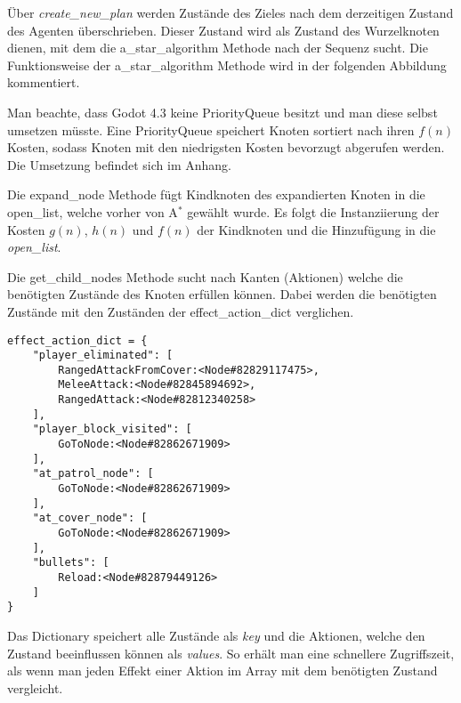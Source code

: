 Über \textit{create\_new\_plan} werden Zustände des Zieles nach dem derzeitigen Zustand des Agenten überschrieben. Dieser Zustand wird als Zustand des Wurzelknoten dienen, mit dem die a\_star\_algorithm Methode nach der Sequenz sucht. Die Funktionsweise der a\_star\_algorithm Methode wird in der folgenden Abbildung kommentiert.



Man beachte, dass Godot 4.3 keine PriorityQueue besitzt und man diese selbst umsetzen müsste. Eine PriorityQueue speichert Knoten sortiert nach ihren $f(n)$ Kosten, sodass Knoten mit den niedrigsten Kosten bevorzugt abgerufen werden. Die Umsetzung befindet sich im Anhang.

Die expand\_node Methode fügt Kindknoten des expandierten Knoten in die open\_list, welche vorher von A$^*$ gewählt wurde. Es folgt die Instanziierung der Kosten $g(n)$, $h(n)$ und $f(n)$ der Kindknoten und die Hinzufügung in die \textit{open\_list}.



Die get\_child\_nodes Methode sucht nach Kanten (Aktionen) welche die benötigten Zustände des Knoten erfüllen können. Dabei werden die benötigten Zustände mit den Zuständen der effect\_action\_dict verglichen.

\begin{lstlisting}[language=dict, caption={effect\_action\_dict aus der Implementierung}]
effect_action_dict = {
    "player_eliminated": [
        RangedAttackFromCover:<Node#82829117475>,
        MeleeAttack:<Node#82845894692>,
        RangedAttack:<Node#82812340258>
    ],
    "player_block_visited": [
        GoToNode:<Node#82862671909>
    ],
    "at_patrol_node": [
        GoToNode:<Node#82862671909>
    ],
    "at_cover_node": [
        GoToNode:<Node#82862671909>
    ],
    "bullets": [
        Reload:<Node#82879449126>
    ]
}
\end{lstlisting}

Das Dictionary speichert alle Zustände als \textit{key} und die Aktionen, welche den Zustand beeinflussen können als \textit{values}. So erhält man eine schnellere Zugriffszeit, als wenn man jeden Effekt einer Aktion im Array mit dem benötigten Zustand vergleicht. 

